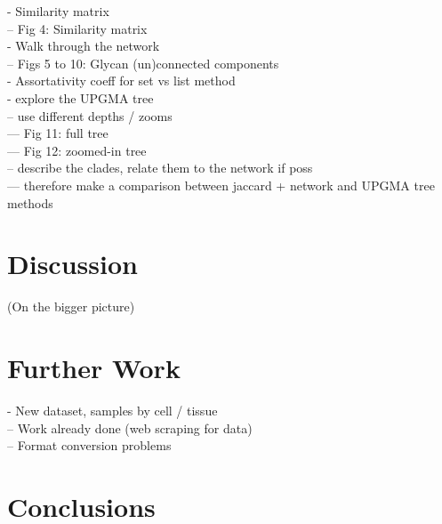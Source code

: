 \documentclass[12pt,a4paper]{article}
\begin{document}
- Similarity matrix\\
-- Fig 4: Similarity matrix\\
- Walk through the network\\
-- Figs 5 to 10: Glycan (un)connected components\\
- Assortativity coeff for set vs list method\\

- explore the UPGMA tree\\
-- use different depths / zooms\\
--- Fig 11: full tree\\
--- Fig 12: zoomed-in tree\\
-- describe the clades, relate them to the network if poss\\
--- therefore make a comparison between jaccard + network and UPGMA tree methods\\


\section{Discussion}
\label{sec:discussion}
(On the bigger picture)\\

\section{Further Work}
\label{sec:further_work}

- New dataset, samples by cell / tissue\\
-- Work already done (web scraping for data)\\
-- Format conversion problems\\


\section{Conclusions}
\label{sec:conclusions}

\newpage
\appendix
\end{document}
